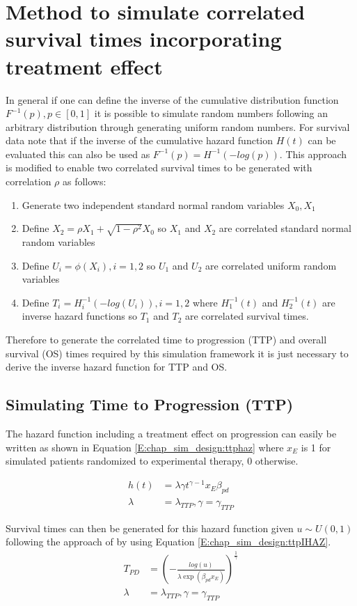 \section{Method to simulate correlated survival times incorporating treatment effect}
\label{S:chap_sim_design:simsurv}
In general if one can define the inverse of the cumulative distribution function $F^{-1}(p), p\in [0,1]$ it is possible to simulate random numbers following an arbitrary distribution through generating uniform random numbers. For survival data \cite{Bender2005} note that if the inverse of the cumulative hazard function $H(t)$ can be evaluated this can also be used as $F^{-1}(p) = H^{-1}(-log(p))$. This approach is modified to enable two correlated survival times to be generated with correlation $\rho$ as follows: 
\begin{enumerate}
\item Generate two independent standard normal random variables $X_0, X_1$ 
\item Define $X_2 = \rho X_1 + \sqrt{1-\rho^2} X_0 $ so $X_1$ and $X_2$ are correlated standard normal random variables
\item Define $U_i = \phi (X_i), i=1,2$ so $U_1$ and $U_2$ are correlated uniform random variables
\item Define $T_i = H_i^{-1}(-log(U_i)), i=1,2$ where $H_1^{-1}(t)$ and $H_2^{-1}(t)$ are inverse hazard functions so $T_1$ and $T_2$ are correlated survival times.
\end{enumerate}

Therefore to generate the correlated time to progression (TTP) and overall survival (OS) times required by this simulation framework it is just necessary to derive the inverse hazard function for TTP and OS.

\subsection{Simulating Time to Progression (TTP)}

The hazard function including a treatment effect on progression can easily be written as shown in Equation \ref{E:chap_sim_design:ttphaz} where $x_{E}$ is 1 for simulated patients randomized to experimental therapy, 0 otherwise. 

\begin{align}
\label{E:chap_sim_design:ttphaz}
h(t) &= \lambda \gamma t^{\gamma-1} x_{E} \beta_{pd} \\
\lambda &= \lambda_{TTP}, \gamma = \gamma_{TTP} \nonumber
\end{align}
\par
Survival times can then be generated for this hazard function given $u \sim U(0,1)$ following the approach of \cite{Bender2005} by using Equation \ref{E:chap_sim_design:ttpIHAZ}.
\begin{align}
\label{E:chap_sim_design:ttpIHAZ}
T_{PD} &= \left( - \frac{log(u)}{\lambda \exp( \beta_{pd} x_{E})} \right) ^\frac{1}{\gamma}
\\
\lambda &= \lambda_{TTP}, \gamma = \gamma_{TTP} \nonumber
\end{align}

